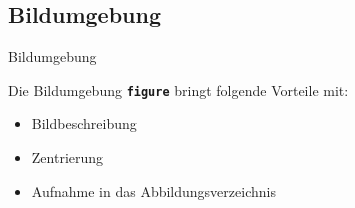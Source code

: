 \subsection{Bildumgebung}
\begin{frame}[fragile]{Bildumgebung}   
\begin{multicols}{2}
	Die Bildumgebung \textbf{\texttt{figure}} bringt folgende Vorteile mit:
\begin{itemize}
\item Bildbeschreibung
\item Zentrierung
\item Aufnahme in das Abbildungsverzeichnis
\end{itemize}


\end{multicols}
\end{frame}
